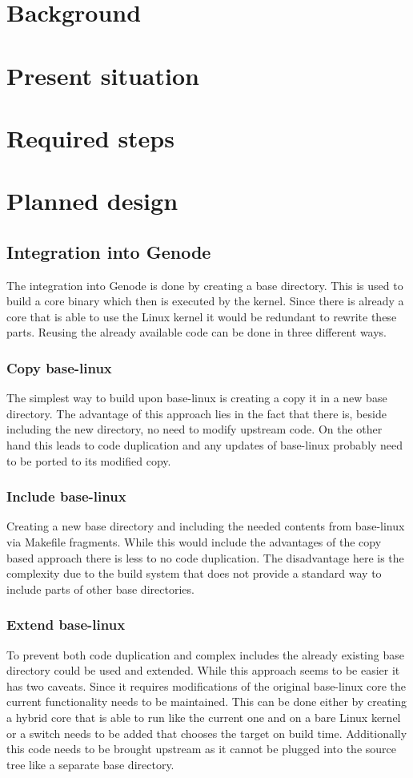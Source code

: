 \documentclass[
a4paper,
12pt,
notitlepage,
parskip=half,
DIV=11,
]{scrbook}
\begin{document}
	
	\tableofcontents
	
	\chapter{Background}
	\chapter{Present situation} %
	\chapter{Required steps} %
	\chapter{Planned design}
		\section{Integration into Genode}
		The integration into Genode is done by creating a base directory.
		This is used to build a core binary which then is executed by the kernel.
		Since there is already a core that is able to use the Linux kernel it would be redundant to rewrite these parts.
		Reusing the already available code can be done in three different ways.
		\subsection{Copy base-linux}
		The simplest way to build upon base-linux is creating a copy it in a new base directory.
		The advantage of this approach lies in the fact that there is, beside including the new directory, no need to modify upstream code.
		On the other hand this leads to code duplication and any updates of base-linux probably need to be ported to its modified copy.
		\subsection{Include base-linux}
		Creating a new base directory and including the needed contents from base-linux via Makefile fragments.
		While this would include the advantages of the copy based approach there is less to no code duplication.
		The disadvantage here is the complexity due to the build system that does not provide a standard way to include parts of other base directories.
		\subsection{Extend base-linux}
		To prevent both code duplication and complex includes the already existing base directory could be used and extended.
		While this approach seems to be easier it has two caveats.
		Since it requires modifications of the original base-linux core the current functionality needs to be maintained.
		This can be done either by creating a hybrid core that is able to run like the current one and on a bare Linux kernel or a switch needs to be added that chooses the target on build time.
		Additionally this code needs to be brought upstream as it cannot be plugged into the source tree like a separate base directory.
\end{document}
